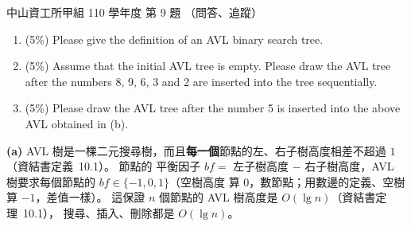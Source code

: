 \begin{pastexam}[label={px:nsysu-110-osds-03}]{中山資工所甲組 110 學年度 第 9 題}
（問答、追蹤）

\begin{enumerate}[label=(\alph*)]
\item (5\%) Please give the definition of an AVL binary search tree.
\item (5\%) Assume that the initial AVL tree is empty. Please draw the AVL tree after the numbers 8,
9, 6, 3 and 2 are inserted into the tree sequentially.
\item (5\%) Please draw the AVL tree after the number 5 is inserted into the above AVL obtained in
(b).
\end{enumerate}
\end{pastexam}

\begin{pastsoln}
\textbf{(a)} AVL 樹是一棵二元搜尋樹，而且\textbf{每一個}節點的左、右子樹高度相差不超過 $1$（資結書定義~10.1）。 節點的
平衡因子 $\mathit{bf} = $ 左子樹高度 $-$ 右子樹高度，AVL 樹要求每個節點的 $\mathit{bf} \in \{-1, 0, 1\}$（空樹高度
算 $0$，數節點；用數邊的定義、空樹算 $-1$，差值一樣）。 這保證 $n$ 個節點的 AVL 樹高度是 $O(\lg n)$（資結書定理~10.1），
搜尋、插入、刪除都是 $O(\lg n)$。


\end{pastsoln}
